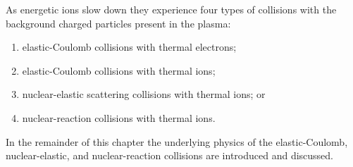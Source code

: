 \documentclass[../main.tex]{subfiles}
\begin{document}
As energetic ions slow down they experience four types of collisions with the background charged particles present in the plasma:
\begin{enumerate}
    \item elastic-Coulomb collisions with thermal electrons;
    \item elastic-Coulomb collisions with thermal ions;
    \item nuclear-elastic scattering collisions with thermal ions; or
    \item nuclear-reaction collisions with thermal ions.
\end{enumerate}
In the remainder of this chapter the underlying physics of the elastic-Coulomb, nuclear-elastic, and nuclear-reaction collisions are introduced and discussed.








\end{document}
